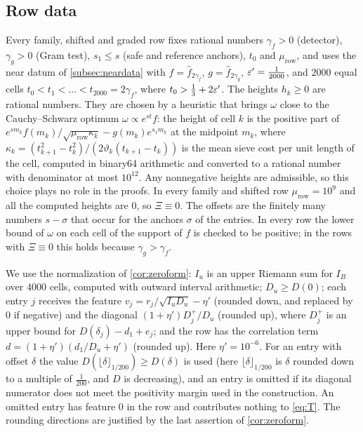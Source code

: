 \subsection{Row data}\label{subsec:rowdata}
Every family, shifted and graded row fixes rational numbers $\gamma_f>0$ (detector), $\gamma_g>0$ (Gram test),
$s_1\le s$ (safe and reference anchors), $t_0$ and $\mu_{\mathrm{row}}$, and uses the near datum of \cref{subsec:neardata} with
$f=\hat f_{2\gamma_f}$, $g=\hat f_{2\gamma_g}$, $\varepsilon'=\frac1{2000}$, and $2000$ equal cells
$t_0<t_1<\dots<t_{2000}=2\gamma_f$, where $t_0>\frac13+2\varepsilon'$. The heights $h_k\ge0$ are rational numbers.
They are chosen by a heuristic that brings $\omega$ close to the Cauchy--Schwarz optimum
$\omega\propto e^{st}f$: the height of cell $k$ is the positive part of
$e^{sm_k}f(m_k)/\sqrt{\mu_{\mathrm{row}}\kappa_k}-g(m_k)e^{s_1m_k}$ at the midpoint $m_k$, where
$\kappa_k=(t_{k+1}^2-t_k^2)/(2\vartheta_k(t_{k+1}-t_k))$ is the mean sieve cost per unit length of the cell,
computed in binary64 arithmetic and converted to a rational number with denominator at most
$10^{12}$. Any nonnegative heights are admissible, so this choice plays no role in the proofs. In
every family and shifted row $\mu_{\mathrm{row}}=10^9$ and all the computed heights are $0$, so $\Xi\equiv0$. The
offsets are the finitely many numbers $s-\sigma$ that occur for the anchors $\sigma$ of the entries. In
every row the lower bound of $\omega$ on each cell of the support of $f$ is checked to be positive; in
the rows with $\Xi\equiv0$ this holds because $\gamma_g>\gamma_f$.

We use the normalization of \cref{cor:zeroform}: $I_u$ is an upper Riemann
sum for $I_B$ over $4000$ cells, computed with outward interval arithmetic; $D_u\ge D(0)$; each entry
$j$ receives the feature $v_j=r_j/\sqrt{I_uD_u}-\eta'$ (rounded down, and replaced by $0$ if negative)
and the diagonal $(1+\eta')D_j^+/D_u$ (rounded up), where $D_j^+$ is an upper bound for
$D(\delta_j)-d_1+e_j$; and the row has the correlation term $d=(1+\eta')(d_1/D_u+\eta')$ (rounded up). Here
$\eta'=10^{-6}$. For an entry with offset $\delta$ the value $D(\lfloor\delta\rfloor_{1/200})\ge D(\delta)$ is used
(here $\lfloor\delta\rfloor_{1/200}$ is $\delta$ rounded down to a multiple of $\frac1{200}$, and $D$ is decreasing), and an
entry is omitted if its diagonal numerator does not meet the positivity margin used
in the construction. An omitted entry has feature $0$ in the row and contributes
nothing to \eqref{eq:T}. The rounding directions are justified by the last assertion of
\cref{cor:zeroform}.


